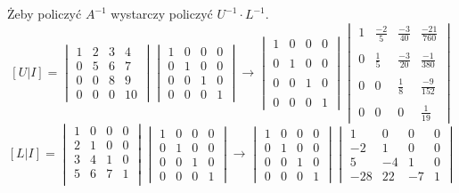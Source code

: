 \documentclass[a4paper]{article}
\begin{document}
Żeby policzyć $A^{-1}$ wystarczy policzyć $U^{-1}\cdot L^{-1}$.
$$[U|I]=\begin{vmatrix}
1 & 2 & 3 & 4\\
0 & 5 & 6 & 7\\
0 & 0 & 8 & 9\\
0 & 0 & 0 & 10
\end{vmatrix}\begin{vmatrix}
1 & 0 & 0 & 0\\
0 & 1 & 0 & 0\\
0 & 0 & 1 & 0\\
0 & 0 & 0 & 1
\end{vmatrix} \rightarrow \begin{vmatrix}
1 & 0 & 0 & 0\\\\
0 & 1 & 0 & 0\\\\
0 & 0 & 1 & 0\\\\
0 & 0 & 0 & 1
\end{vmatrix}\begin{vmatrix}
1 &	\frac{-2}{5} &	\frac{-3}{40} &	\frac{-21}{760}\\\\
0 &	 \frac{1}{5} &	\frac{-3}{20} &	 \frac{-1}{380}\\\\
0 &	   0 &	  \frac{1}{8} &	 \frac{-9}{152}\\\\
0 &	   0 &	    0 &	   \frac{1}{19}

\end{vmatrix}$$ 
$$[L|I]=\begin{vmatrix}
1 & 0 & 0 & 0\\ 
2 & 1 & 0 & 0\\
3 & 4 & 1 & 0\\
5 & 6 & 7 & 1\\
\end{vmatrix}\begin{vmatrix}
1 & 0 & 0 & 0\\
0 & 1 & 0 & 0\\
0 & 0 & 1 & 0\\
0 & 0 & 0 & 1
\end{vmatrix} \rightarrow \begin{vmatrix}
1 & 0 & 0 & 0\\
0 & 1 & 0 & 0\\
0 & 0 & 1 & 0\\
0 & 0 & 0 & 1
\end{vmatrix}\begin{vmatrix}
  1	& 0 & 0 & 0\\
 -2 & 1 & 0 & 0\\
  5 & -4 & 1 & 0\\
-28 & 22 & -7 & 1
\end{vmatrix}$$ 
\end{document}
